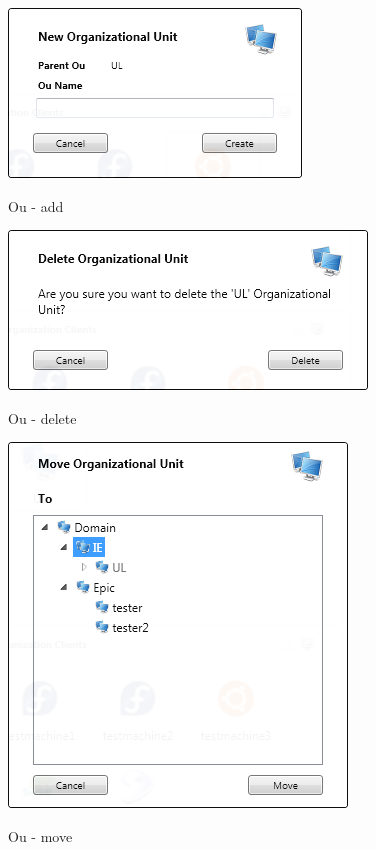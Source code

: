 	\begin{multicols}{2}
	
		\begin{figurehere}
			\centering
			\includegraphics[scale=0.8]{pages/appendix3/figures/lgpscreens/ou-add.png}
			\caption{Ou - add}
			\label{fig:SSOuAdd}
		\end{figurehere}
		
		\vspace{3mm}
		\begin{figurehere}
			\centering
			\includegraphics[scale=0.8]{pages/appendix3/figures/lgpscreens/ou-delete.png}
			\caption{Ou - delete}
			\label{fig:SSOuDelete}
		\end{figurehere}
		
		\columnbreak
		
		\begin{figurehere}
			\centering
			\includegraphics[scale=0.8]{pages/appendix3/figures/lgpscreens/ou-move.png}
			\caption{Ou - move}
			\label{fig:SSOuMove}
		\end{figurehere}
			
	\end{multicols}


